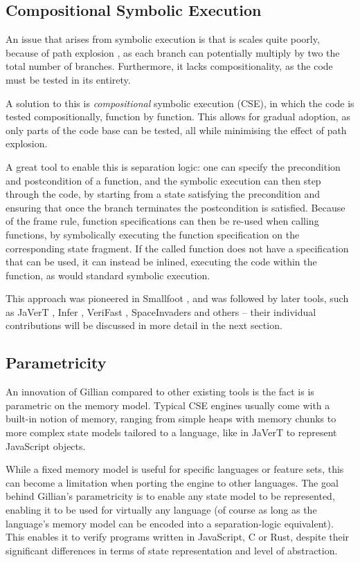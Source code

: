 \subsection{Compositional Symbolic Execution}

An issue that arises from symbolic execution is that is scales quite poorly, because of path explosion \cite{pathexplo,surveysymex}, as each branch can potentially multiply by two the total number of branches. Furthermore, it lacks compositionality, as the code must be tested in its entirety.

A solution to this is \emph{compositional} symbolic execution (CSE), in which the code is tested compositionally, function by function. This allows for gradual adoption, as only parts of the code base can be tested, all while minimising the effect of path explosion.

A great tool to enable this is separation logic: one can specify the precondition and postcondition of a function, and the symbolic execution can then step through the code, by starting from a state satisfying the precondition and ensuring that once the branch terminates the postcondition is satisfied. Because of the frame rule, function specifications can then be re-used when calling functions, by symbolically executing the function specification on the corresponding state fragment. If the called function does not have a specification that can be used, it can instead be inlined, executing the code within the function, as would standard symbolic execution.

This approach was pioneered in Smallfoot \cite{smallfoot}, and was followed by later tools, such as JaVerT \cite{javert1, javert2}, Infer \cite{infer}, VeriFast \cite{verifast}, SpaceInvaders \cite{spaceinvader} and others -- their individual contributions will be discussed in more detail in the next section.

\subsection{Parametricity}

An innovation of Gillian compared to other existing tools is the fact is is parametric on the memory model. Typical CSE engines usually come with a built-in notion of memory, ranging from simple heaps with memory chunks \cite{verifast} to more complex state models tailored to a language, like in JaVerT \cite{javert1, javert2} to represent JavaScript objects.

While a fixed memory model is useful for specific languages or feature sets, this can become a limitation when porting the engine to other languages. The goal behind Gillian's parametricity is to enable any state model to be represented, enabling it to be used for virtually any language (of course as long as the language's memory model can be encoded into a separation-logic equivalent). This enables it to verify programs written in JavaScript, C or Rust, despite their significant differences in terms of state representation and level of abstraction.

